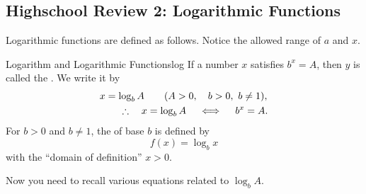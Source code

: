\documentclass[11pt,pdfa,lastpage]{MishoNote}
\begin{document}
\subsection{Highschool Review 2: Logarithmic Functions}
Logarithmic functions are defined as follows. Notice the allowed range of $a$ and $x$.
\begin{definition}{Logarithm and Logarithmic Functions}{log}
  If a number $x$ satisfies $b^x=A$, then $y$ is called the . We write it by
  \begin{align}
    &\notag x=\log_b A\qquad(A>0,\quad b>0,~b\neq 1),\\
    &\qquad \therefore \quad x=\log_b A\quad\iff\quad b^x=A.
  \end{align}
  For $b>0$ and $b\neq 1$, the  of base $b$ is defined by
  \[f(x)=\log_b x\]
  with the ``domain of definition'' $x>0$.
\end{definition}
Now you need to recall various equations related to $\log_b A$.


\ornamentskip
\end{document}

